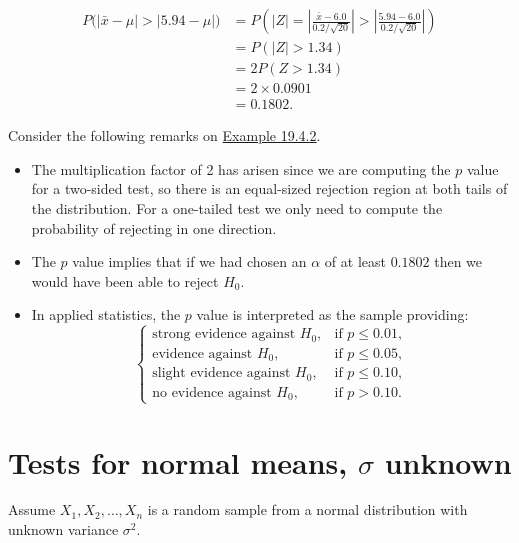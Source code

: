 \documentclass[
]{book}
\providecommand{\tightlist}{%
  \setlength{\itemsep}{0pt}\setlength{\parskip}{0pt}}
\begin{document}
\begin{align*}
P \big( \left| \bar{x} - \mu \right| > \left| 5.94 - \mu \right| \big)  &= P \left( |Z| = \left| \frac{\bar{x}-6.0}{0.2/\sqrt{20}} \right| > \left| \frac{5.94 - 6.0}{0.2/\sqrt{20}} \right| \right) \\
&= P(\left| Z \right| > 1.34 ) \\
&= 2 P (Z > 1.34) \\
&= 2 \times 0.0901 \\
&= 0.1802.
\end{align*}

Consider the following remarks on \protect\hyperlink{Sec_Hypo_Test:ex:coffee_machineII}{Example 19.4.2}.

\begin{itemize}
\tightlist
\item
  The multiplication factor of 2 has arisen since we are computing the \(p\) value for a two-sided test, so there is an equal-sized rejection region at both tails of the distribution. For a one-tailed test we only need to compute the probability of rejecting in one direction.\\
\item
  The \(p\) value implies that if we had chosen an \(\alpha\) of at least \(0.1802\) then we would have been able to reject \(H_0\).\\
\item
  In applied statistics, the \(p\) value is interpreted as the sample providing:\\

  \[ \begin{cases} \text{strong evidence against $H_0$}, & \text{if } p \leq 0.01, \\
  \text{evidence against $H_0$}, & \text{if } p \leq 0.05, \\
  \text{slight evidence against $H_0$}, & \text{if } p \leq 0.10, \\
  \text{no evidence against $H_0$}, & \text{if } p > 0.10. \end{cases}\]
\end{itemize}

\hypertarget{Sec_Hypo_Test:normal_unknown}{%
\section{\texorpdfstring{Tests for normal means, \(\sigma\) unknown}{Tests for normal means, \textbackslash sigma unknown}}\label{Sec_Hypo_Test:normal_unknown}}

Assume \(X_1,X_2,\dots,X_n\) is a random sample from a normal distribution with unknown variance \(\sigma^2\).
\end{document}
